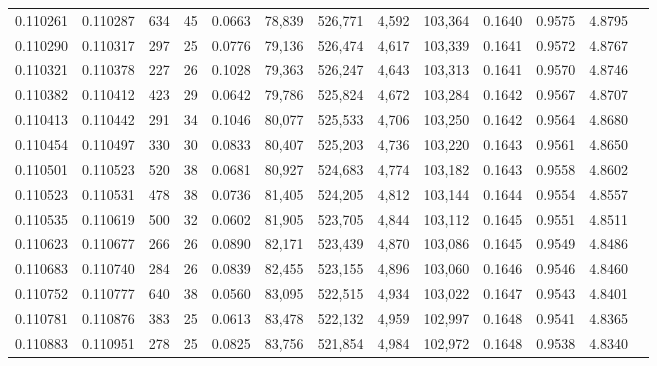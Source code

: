\begin{tabular}{rrrrrrrrrrrrr}
0.110261 & 0.110287 &   634 &  45 &                                     0.0663 &  78,839 & 526,771 &   4,592 & 103,364 & 0.1640 & 0.9575 & 4.8795 \\
0.110290 & 0.110317 &   297 &  25 &                                     0.0776 &  79,136 & 526,474 &   4,617 & 103,339 & 0.1641 & 0.9572 & 4.8767 \\
0.110321 & 0.110378 &   227 &  26 &                                     0.1028 &  79,363 & 526,247 &   4,643 & 103,313 & 0.1641 & 0.9570 & 4.8746 \\
0.110382 & 0.110412 &   423 &  29 &                                     0.0642 &  79,786 & 525,824 &   4,672 & 103,284 & 0.1642 & 0.9567 & 4.8707 \\
0.110413 & 0.110442 &   291 &  34 &                                     0.1046 &  80,077 & 525,533 &   4,706 & 103,250 & 0.1642 & 0.9564 & 4.8680 \\
0.110454 & 0.110497 &   330 &  30 &                                     0.0833 &  80,407 & 525,203 &   4,736 & 103,220 & 0.1643 & 0.9561 & 4.8650 \\
0.110501 & 0.110523 &   520 &  38 &                                     0.0681 &  80,927 & 524,683 &   4,774 & 103,182 & 0.1643 & 0.9558 & 4.8602 \\
0.110523 & 0.110531 &   478 &  38 &                                     0.0736 &  81,405 & 524,205 &   4,812 & 103,144 & 0.1644 & 0.9554 & 4.8557 \\
0.110535 & 0.110619 &   500 &  32 &                                     0.0602 &  81,905 & 523,705 &   4,844 & 103,112 & 0.1645 & 0.9551 & 4.8511 \\
0.110623 & 0.110677 &   266 &  26 &                                     0.0890 &  82,171 & 523,439 &   4,870 & 103,086 & 0.1645 & 0.9549 & 4.8486 \\
0.110683 & 0.110740 &   284 &  26 &                                     0.0839 &  82,455 & 523,155 &   4,896 & 103,060 & 0.1646 & 0.9546 & 4.8460 \\
0.110752 & 0.110777 &   640 &  38 &                                     0.0560 &  83,095 & 522,515 &   4,934 & 103,022 & 0.1647 & 0.9543 & 4.8401 \\
0.110781 & 0.110876 &   383 &  25 &                                     0.0613 &  83,478 & 522,132 &   4,959 & 102,997 & 0.1648 & 0.9541 & 4.8365 \\
0.110883 & 0.110951 &   278 &  25 &                                     0.0825 &  83,756 & 521,854 &   4,984 & 102,972 & 0.1648 & 0.9538 & 4.8340 \\

\end{tabular}
